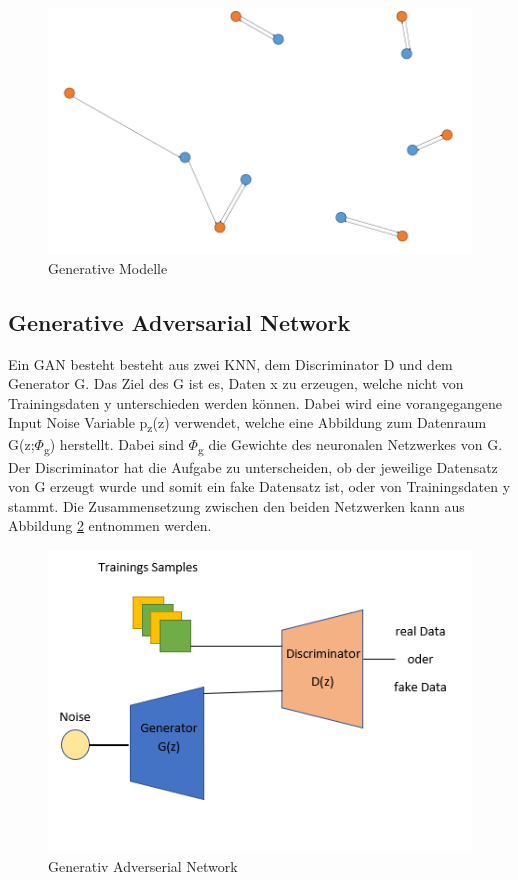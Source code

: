 \documentclass{llncs}
\begin{document}
\begin{figure}[htbp] 
	\centering
	\includegraphics[width=1.0\textwidth]{chamfer.png}
	\caption{Generative Modelle}
	\label{fig:Bild1}
\end{figure}

\subsection{Generative Adversarial Network}

Ein GAN besteht besteht aus zwei KNN, dem Discriminator D und dem Generator G. Das Ziel des G ist es, Daten x zu erzeugen, welche nicht von Trainingsdaten y unterschieden werden können. Dabei wird eine vorangegangene Input Noise Variable p\textsubscript{z}(z) verwendet, welche eine Abbildung zum Datenraum G(z;$\Phi$\textsubscript{g}) herstellt. Dabei sind $\Phi$\textsubscript{g} die Gewichte des neuronalen Netzwerkes von G. Der Discriminator hat die Aufgabe zu unterscheiden, ob der jeweilige Datensatz von G erzeugt wurde und somit ein fake Datensatz ist, oder von Trainingsdaten y stammt\cite{goodfellow2014}. Die Zusammensetzung zwischen den beiden Netzwerken kann aus Abbildung \ref{fig:Bild5} entnommen werden.
\\
\begin{figure}[htbp] 
	\centering
	\includegraphics[width=1.0\textwidth]{GAN_GRUNDAUFBAU.png}
	\caption{Generativ Adverserial Network}
	\label{fig:Bild5}
\end{figure}
\end{document}
